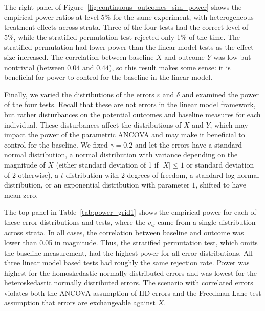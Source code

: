\documentclass[12pt]{article}
\begin{document}
The right panel of Figure~\ref{fig:continuous_outcomes_sim_power} shows the empirical power ratios at level 5\% for the same experiment, with heterogeneous treatment effects across strata.
Three of the four tests had the correct level of 5\%, while the stratified permutation test rejected only 1\% of the time.
The stratified permutation had lower power than the linear model tests as the effect size increased.
The correlation between baseline $X$ and outcome $Y$ was low but nontrivial (between $0.04$ and $0.44$), so this result makes some sense:
it is beneficial for power to control for the baseline in the linear model.

Finally, we varied the distributions of the errors $\varepsilon$ and $\delta$ and examined the power of the four tests.
Recall that these are not errors in the linear model framework, but rather disturbances on the potential outcomes and baseline measures for each individual.
These disturbances affect the distributions of $X$ and $Y$, which may impact the power of the parametric ANCOVA and may make it beneficial to control for the baseline.
We fixed $\gamma=0.2$ and let the errors have a standard normal distribution, a normal distribution with variance depending on the magnitude of $X$ (either standard deviation of 1 if $\lvert X \rvert \leq 1$ or standard deviation of 2 otherwise), a $t$ distribution with 2 degrees of freedom, a standard log normal distribution, or an exponential distribution with parameter $1$, shifted to have mean zero.

The top panel in Table~\ref{tab:power_grid1} shows the empirical power for each of these error distributions and tests, where the $v_{ij}$ came from a single distribution across strata.
In all cases, the correlation between baseline and outcome was lower than 0.05 in magnitude.
Thus, the stratified permutation test, which omits the baseline measurement, had the highest power for all error distributions.
All three linear model based tests had roughly the same rejection rate.
Power was highest for the homoskedastic normally distributed errors and was lowest for the heteroskedastic normally distributed errors.
The scenario with correlated errors violates both the ANCOVA assumption of IID errors and the Freedman-Lane test assumption that errors are exchangeable against $X$.
\end{document}
